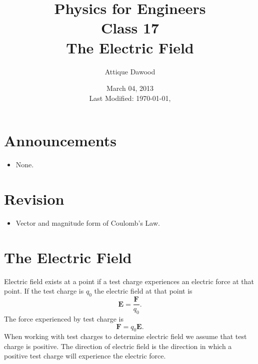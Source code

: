 \documentclass[12pt,a4paper]{article}
\title{\vspace{-2cm}Physics for Engineers\\Class 17\\The Electric Field}
\author{Attique Dawood}
\date{March 04, 2013\\[0.2cm] Last Modified: \today, \currenttime}
\begin{document}
\maketitle
\section{Announcements}
\begin{itemize}
\item None.
\end{itemize}
\section{Revision}
\begin{itemize}
\item Vector and magnitude form of Coulomb's Law.
\end{itemize}
\section{The Electric Field}
Electric field exists at a point if a test charge experiences an electric force at that point. If the test charge is $q_0$ the electric field at that point is
\begin{equation}
\textbf{E}=\dfrac{\textbf{F}}{q_0}.
\end{equation}
The force experienced by test charge is
\begin{equation}
\textbf{F}=q_0\textbf{E}.
\end{equation}
When working with test charges to determine electric field we assume that test charge is positive. The direction of electric field is the direction in which a positive test charge will experience the electric force.
\end{document}
